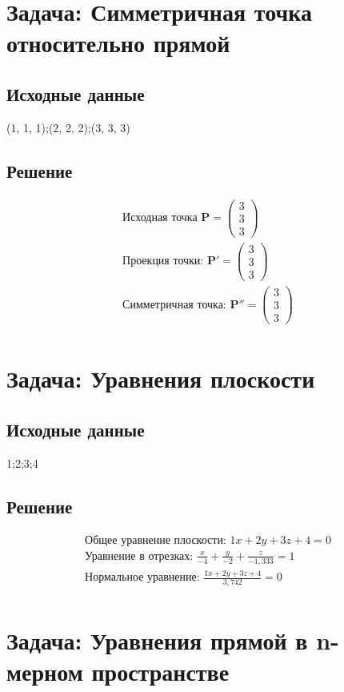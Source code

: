 \documentclass{article}
\begin{document}
\section{Задача: Симметричная точка относительно прямой}
\subsection{Исходные данные}
(1, 1, 1);(2, 2, 2);(3, 3, 3)
\subsection{Решение}
\begin{align*}
\text{Исходная точка } \mathbf{P} = \begin{pmatrix}3 \\ 3 \\ 3\end{pmatrix}\\
\text{Проекция точки: } \mathbf{P}' = \begin{pmatrix}3 \\ 3 \\ 3\end{pmatrix}\\
\text{Симметричная точка: } \mathbf{P}'' = \begin{pmatrix}3 \\ 3 \\ 3\end{pmatrix}\\
\end{align*}
\section{Задача: Уравнения плоскости}
\subsection{Исходные данные}
1;2;3;4
\subsection{Решение}
\begin{align*}
\text{Общее уравнение плоскости: }
1x + 2y + 3z + 4 = 0\\
\text{Уравнение в отрезках: }
\frac{x}{-4} + \frac{y}{-2} + \frac{z}{-1,333} = 1\\
\text{Нормальное уравнение: }
\frac{1x + 2y + 3z + 4}{3,742} = 0\\
\end{align*}
\section{Задача: Уравнения прямой в n-мерном пространстве}
\end{document}
